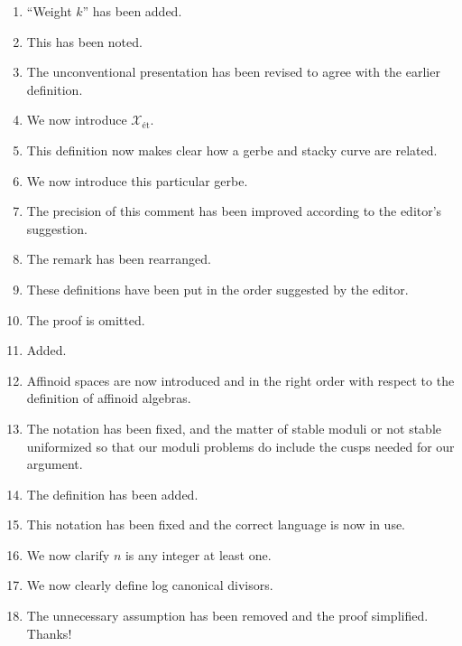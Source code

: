 \documentclass[12pt]{article}
\begin{document}
\begin{enumerate}
		\item ``Weight $k$'' has been added.
		
		\item This has been noted.
		
		\item The unconventional presentation has been revised to agree with the earlier definition. 
		
		\item We now introduce $\mathscr{X}_{\text{\'et}}.$
		
		\item This definition now makes clear how a gerbe and stacky curve are related.
		
		\item We now introduce this particular gerbe.	
		
		\item The precision of this comment has been improved according to the editor's suggestion.
		
		\item The remark has been rearranged.
		
		\item These definitions have been put in the order suggested by the editor.
		
		\item The proof is omitted.
		
		\item Added.
		
		\item Affinoid spaces are now introduced and in the right order with respect to the definition of affinoid algebras.
		
		\item The notation has been fixed, and the matter of stable moduli or not stable uniformized so that our moduli problems do include the cusps needed for our argument.
		
		\item The definition has been added.
		
		\item This notation has been fixed and the correct language is now in use.
		
		\item We now clarify $n$ is any integer at least one.
		
		\item We now clearly define log canonical divisors.
		
		\item The unnecessary assumption has been removed and the proof simplified. Thanks!
		

\end{enumerate}
\end{document}
